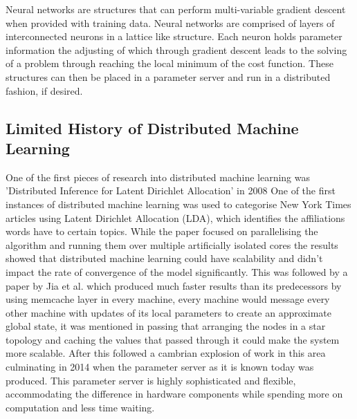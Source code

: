 Neural networks are structures that can perform multi-variable gradient descent
when provided with training data. Neural networks are comprised of layers of
interconnected neurons in a lattice like structure. Each neuron holds parameter
information the adjusting of which through gradient descent leads to the solving
of a problem through reaching the local minimum of the cost function. These
structures can then be placed in a parameter server and run in a distributed
fashion, if desired.

\subsection{Limited History of Distributed Machine Learning}

One of the first pieces of research into distributed machine learning was
’Distributed Inference for Latent Dirichlet Allocation’ in 2008
\cite{newman2008distributed} One of the first instances of distributed machine
learning  was  used  to  categorise  New York  Times  articles  using  Latent
Dirichlet Allocation (LDA), which identifies the affiliations words have to
certain topics. While the paper focused on parallelising the algorithm and
running them over multiple artificially isolated cores the results showed that
distributed machine learning could have scalability and didn’t impact the rate
of convergence of the model significantly. This was followed by a paper by Jia
et al. \cite{ParallelTopicModels} which produced much faster results than its
predecessors by using memcache layer in every machine, every machine would
message every other machine with updates of its local parameters to create an
approximate global state, it was mentioned in passing that arranging the nodes
in a star topology and caching the values that passed through it could make the
system more scalable. After this followed a cambrian explosion of work in this
area \cite{Ahmed2012YahooLDA, li2014communication, Dean2012Distbelief,
googlemapreduce2008} culminating in 2014 when the parameter server as it is
known today \cite{LI2014ParameterServers} was produced. This parameter server is
highly sophisticated and flexible, accommodating the difference in hardware
components while spending more on computation and less time waiting.


